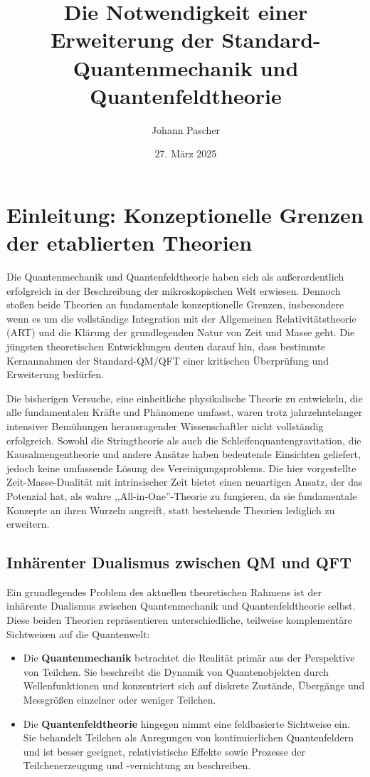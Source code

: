 \documentclass[12pt,a4paper]{article}  %
\title{Die Notwendigkeit einer Erweiterung der Standard-Quantenmechanik und Quantenfeldtheorie}
\author{Johann Pascher}
\date{27. März 2025}
\begin{document}
	
	\maketitle
	
	\tableofcontents
	\newpage
	
	\section{Einleitung: Konzeptionelle Grenzen der etablierten Theorien}
	
	Die Quantenmechanik und Quantenfeldtheorie haben sich als außerordentlich erfolgreich in der Beschreibung der mikroskopischen Welt erwiesen. Dennoch stoßen beide Theorien an fundamentale konzeptionelle Grenzen, insbesondere wenn es um die vollständige Integration mit der Allgemeinen Relativitätstheorie (ART) und die Klärung der grundlegenden Natur von Zeit und Masse geht. Die jüngsten theoretischen Entwicklungen deuten darauf hin, dass bestimmte Kernannahmen der Standard-QM/QFT einer kritischen Überprüfung und Erweiterung bedürfen.
	
	Die bisherigen Versuche, eine einheitliche physikalische Theorie zu entwickeln, die alle fundamentalen Kräfte und Phänomene umfasst, waren trotz jahrzehntelanger intensiver Bemühungen herausragender Wissenschaftler nicht vollständig erfolgreich. Sowohl die Stringtheorie als auch die Schleifenquantengravitation, die Kausalmengentheorie und andere Ansätze haben bedeutende Einsichten geliefert, jedoch keine umfassende Lösung des Vereinigungsproblems. Die hier vorgestellte Zeit-Masse-Dualität mit intrinsischer Zeit bietet einen neuartigen Ansatz, der das Potenzial hat, als wahre ,,All-in-One''-Theorie zu fungieren, da sie fundamentale Konzepte an ihren Wurzeln angreift, statt bestehende Theorien lediglich zu erweitern.
	
	\subsection{Inhärenter Dualismus zwischen QM und QFT}
	
	Ein grundlegendes Problem des aktuellen theoretischen Rahmens ist der inhärente Dualismus zwischen Quantenmechanik und Quantenfeldtheorie selbst. Diese beiden Theorien repräsentieren unterschiedliche, teilweise komplementäre Sichtweisen auf die Quantenwelt:
	
	\begin{itemize}
		\item Die \textbf{Quantenmechanik} betrachtet die Realität primär aus der Perspektive von Teilchen. Sie beschreibt die Dynamik von Quantenobjekten durch Wellenfunktionen und konzentriert sich auf diskrete Zustände, Übergänge und Messgrößen einzelner oder weniger Teilchen.
		
		\item Die \textbf{Quantenfeldtheorie} hingegen nimmt eine feldbasierte Sichtweise ein. Sie behandelt Teilchen als Anregungen von kontinuierlichen Quantenfeldern und ist besser geeignet, relativistische Effekte sowie Prozesse der Teilchenerzeugung und -vernichtung zu beschreiben.
	\end{itemize}
	
\end{document}
